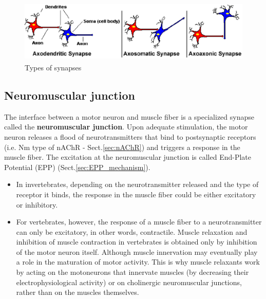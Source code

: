 \begin{figure}[htb]
  \centerline{\includegraphics[height=3cm]{./images/synapse_classification_03.eps}}
  \caption{Types of synapses}\label{fig:synapse_classification_03}
\end{figure}

\subsection{Neuromuscular junction}
\label{sec:neur-junct}
\label{sec:neuromuscular-junction}

The interface between a motor neuron and muscle fiber is a specialized synapse
called the {\bf neuromuscular junction}. Upon adequate stimulation, the motor
neuron releases a flood of neurotransmitters that bind to postsynaptic receptors
(i.e. Nm type of nAChR - Sect.\ref{sec:nAChR}) and triggers a response in the
muscle fiber. The excitation at the neuromuscular junction is called End-Plate
Potential (EPP) (Sect.\ref{sec:EPP_mechanism}).


\begin{itemize}
\item In invertebrates, depending on the neurotransmitter released and
  the type of receptor it binds, the response in the muscle fiber
  could be either excitatory or inhibitory.

\item For vertebrates, however, the response of a muscle fiber to a
  neurotransmitter can only be excitatory, in other words,
  contractile. Muscle relaxation and inhibition of muscle contraction
  in vertebrates is obtained only by inhibition of the motor neuron
  itself. Although muscle innervation may eventually play a role in
  the maturation of motor activity. This is why muscle relaxants work
  by acting on the motoneurons that innervate muscles (by decreasing
  their electrophysiological activity) or on cholinergic neuromuscular
  junctions, rather than on the muscles themselves.

\end{itemize}

